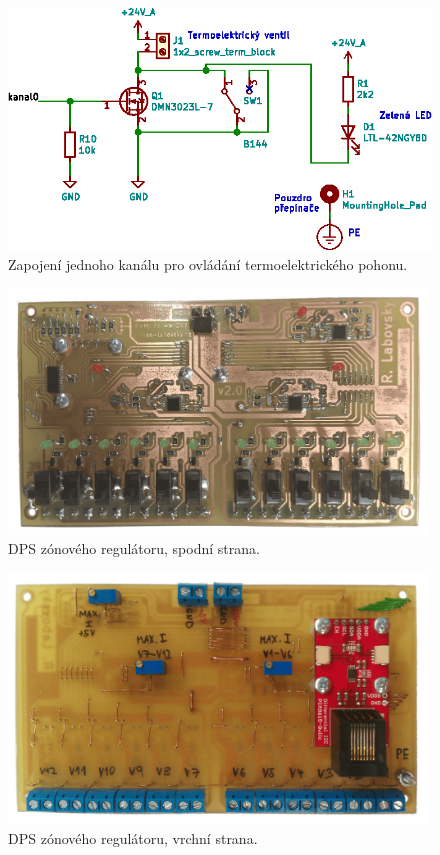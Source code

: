 \begin{figure}[H]
    \centering
    \includegraphics[width=\textwidth]{images/svg/kicad/zonovy-regulator-mosfet-pwm-1-kanal.eps}
    \caption{Zapojení jednoho kanálu pro ovládání termoelektrického pohonu.}
    \label{fig:zonovy-regulator-mosfet-pwm-1-kanal}
\end{figure}

\begin{figure}[H]
    \centering
    \includegraphics[width=0.99\textwidth]{images/zonovy-regulator/dps-zonovy-regulator-spodni-strana.png}
    \caption{DPS zónového regulátoru, spodní strana.}
    \label{fig:dps-zonovy-regulator-spodni-strana}
\end{figure}

\begin{figure}[H]
    \centering
    \includegraphics[width=0.99\textwidth]{images/zonovy-regulator/dps-zonovy-regulator-vrchni-strana.png}
    \caption{DPS zónového regulátoru, vrchní strana.}
    \label{fig:dps-zonovy-regulator-vrchni-strana}
\end{figure}


